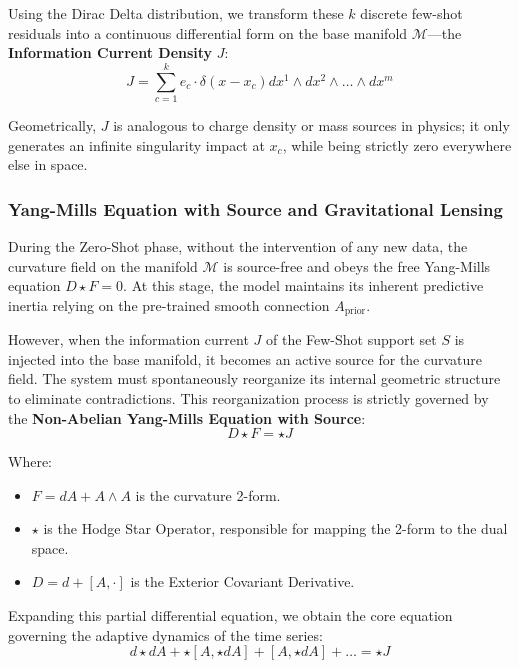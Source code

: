 \documentclass{article}
\begin{document}
Using the Dirac Delta distribution, we transform these $k$ discrete few-shot residuals into a continuous differential form on the base manifold $\mathcal{M}$---the \textbf{Information Current Density} $J$:
\begin{equation}
J = \sum_{c=1}^k e_c \cdot \delta(x - x_c) dx^1 \wedge dx^2 \wedge \dots \wedge dx^m
\end{equation}

Geometrically, $J$ is analogous to charge density or mass sources in physics; it only generates an infinite singularity impact at $x_c$, while being strictly zero everywhere else in space.

\subsubsection{Yang-Mills Equation with Source and Gravitational Lensing}

During the Zero-Shot phase, without the intervention of any new data, the curvature field on the manifold $\mathcal{M}$ is source-free and obeys the free Yang-Mills equation $D \star F = 0$. At this stage, the model maintains its inherent predictive inertia relying on the pre-trained smooth connection $A_{\text{prior}}$.

However, when the information current $J$ of the Few-Shot support set $S$ is injected into the base manifold, it becomes an active source for the curvature field. The system must spontaneously reorganize its internal geometric structure to eliminate contradictions. This reorganization process is strictly governed by the \textbf{Non-Abelian Yang-Mills Equation with Source}:
\begin{equation}
D \star F = \star J
\end{equation}

Where:
\begin{itemize}
    \item $F = dA + A \wedge A$ is the curvature 2-form.
    \item $\star$ is the Hodge Star Operator, responsible for mapping the 2-form to the dual space.
    \item $D = d + [A, \cdot]$ is the Exterior Covariant Derivative.
\end{itemize}

Expanding this partial differential equation, we obtain the core equation governing the adaptive dynamics of the time series:
\begin{equation}
d \star dA + \star [A, \star dA] + [A, \star dA] + \dots = \star J
\end{equation}
\end{document}
